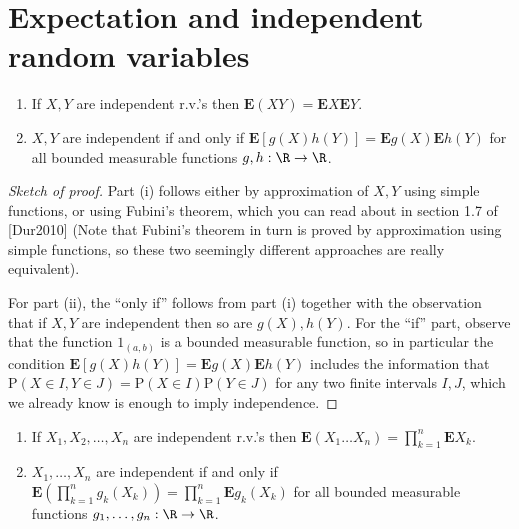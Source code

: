 \section{Expectation and independent random variables}

\begin{thm}

\begin{enumerate}[label=(\roman*)]
\item If $X,Y$ are independent r.v.'s then
$\mathbf{E}(X Y) = \mathbf{E} X \mathbf{E} Y$.

\item $X,Y$ are independent if and only if
$\mathbf{E}[g(X)h(Y)] = \mathbf{E} g(X) \mathbf{E}
h(Y)$
for all bounded measurable functions $g,h:\R\to\R$.
\end{enumerate}

\end{thm}

\begin{proof}[Sketch of proof]
Part (i) follows either by approximation of $X,Y$
using simple functions, or using Fubini's theorem,
which you can read about in section 1.7 of [Dur2010]
(Note that Fubini's theorem in turn is proved by
approximation using simple functions, so these two
seemingly different approaches are really equivalent).

For part (ii), the ``only if'' follows from part (i)
together with the observation that if $X,Y$ are
independent then so are $g(X), h(Y)$. For the ``if''
part, observe that the function $1_{(a,b)}$ is a
bounded measurable function, so in particular the
condition
$\mathbf{E}[g(X)h(Y)]=\mathbf{E} g(X) \mathbf{E}
h(Y)$
includes the information that
$\mathrm{P}(X\in I, Y\in J)=\mathrm{P}(X \in I)
\mathrm{P}(Y\in J)$
for any two finite intervals $I,J$, which we already
know is enough to imply independence.
\end{proof}

\begin{thm}

\begin{enumerate}[label=(\roman*)]
\item If $X_1,X_2,\ldots,X_n$ are independent r.v.'s then
$\mathbf{E}(X_1 \ldots X_n) = \prod_{k=1}^n
\mathbf{E} X_k$.

\item $X_1,\ldots,X_n$ are independent if and only if
$\mathbf{E}\left(\prod_{k=1}^n g_k(X_k)\right) =
\prod_{k=1}^n \mathbf{E} g_k(X_k)$
for all bounded measurable functions
$g_1,\ldots,g_n:\R\to\R$.
\end{enumerate}

\end{thm}

